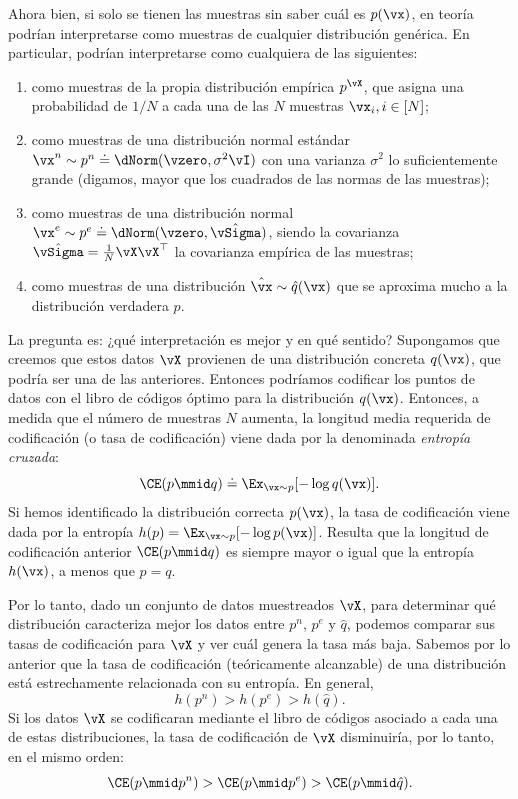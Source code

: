 \documentclass[../../book-main.tex]{subfiles}
\begin{document}
Ahora bien, si solo se tienen las muestras sin saber cuál es \(p(\vx)\), en
teoría podrían interpretarse como muestras de cualquier distribución
genérica. En particular, podrían interpretarse como cualquiera de las siguientes:
\begin{enumerate}
    \item como muestras de la propia distribución empírica \(p^{\vX}\),
        que asigna una probabilidad de \(1/N\) a cada una de las
        \(N\) muestras \(\vx_{i}, i \in [N]\); 
    \item como muestras de una distribución normal estándar \(\vx^{n}
        \sim p^{n} \doteq \dNorm(\vzero, \sigma^{2} \vI)\) con
        una varianza \(\sigma^{2}\) lo suficientemente grande (digamos, mayor que los cuadrados de las
        normas de las muestras); 
    \item como muestras de una distribución normal \(\vx^{e} \sim p^{e}
        \doteq \dNorm(\vzero, \hat{\vSigma})\), siendo la covarianza
        \(\hat{\vSigma} = \frac{1}{N} \vX \vX^{\top}\) la
        covarianza empírica de las muestras; 
    \item como muestras de una distribución \(\hat{\vx} \sim
        \hat{q}(\vx)\) que se aproxima mucho a la distribución
        verdadera \(p\). 
\end{enumerate}
La pregunta es: ¿qué interpretación es mejor y en qué sentido? Supongamos
que creemos que estos datos \(\vX\) provienen de una distribución concreta
\(q(\vx)\), que podría ser una de las anteriores. Entonces podríamos
codificar los puntos de datos con el libro de códigos óptimo para la distribución
\(q(\vx)\). Entonces, a medida que el número de muestras \(N\) aumenta, la
longitud media requerida de codificación (o tasa de codificación) viene dada por la
denominada \textit{entropía cruzada}:
\begin{equation}
    \CE(p \mmid q) \doteq \Ex_{\vx \sim p}[-\log q(\vx)].
\end{equation}
Si hemos identificado
la distribución correcta \(p(\vx)\), la tasa de codificación viene dada por la
entropía \(h(p) = \Ex_{\vx \sim p}[-\log p(\vx)]\). Resulta
que la longitud de codificación anterior \(\CE(p \mmid q)\) es siempre mayor
o igual que la entropía \(h(\vx)\), a menos que \(p = q\).

Por lo tanto, dado un conjunto de datos muestreados \(\vX\), para determinar qué
distribución caracteriza mejor los datos entre
\(p^{n}\), \(p^{e}\) y \(\hat{q}\), podemos comparar sus tasas de codificación
para \(\vX\) y ver cuál genera la tasa más baja. Sabemos
por lo anterior que la tasa de codificación (teóricamente alcanzable) de una
distribución está estrechamente relacionada con su entropía. En general,
\begin{equation}
    h(p^{n}) > h(p^{e}) > h(\hat{q}).
\end{equation}
Si los datos \(\vX\) se codificaran mediante el libro de códigos asociado
a cada una de estas distribuciones, la tasa de codificación de \(\vX\)
disminuiría, por lo tanto, en el mismo orden:
\begin{equation}
    \CE(p \mmid p^{n}) > \CE(p \mmid p^{e}) > \CE(p \mmid \hat{q}).
\end{equation}
\end{document}
